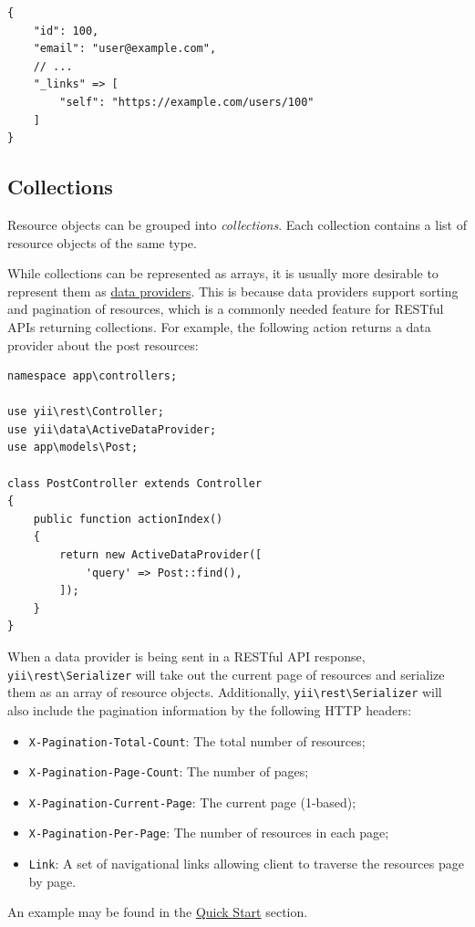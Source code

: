 \begin{lstlisting}
{
    "id": 100,
    "email": "user@example.com",
    // ...
    "_links" => [
        "self": "https://example.com/users/100"
    ]
}
\end{lstlisting}
\subsection{Collections \label{rest-resources.md::collections}}
Resource objects can be grouped into \textit{collections}. Each collection contains a list of resource objects
of the same type.

While collections can be represented as arrays, it is usually more desirable to represent them
as \hyperref[output-data-providers.md]{data providers}. This is because data providers support sorting and pagination
of resources, which is a commonly needed feature for RESTful APIs returning collections. For example,
the following action returns a data provider about the post resources:

\lstset{language=php}\begin{lstlisting}
namespace app\controllers;

use yii\rest\Controller;
use yii\data\ActiveDataProvider;
use app\models\Post;

class PostController extends Controller
{
    public function actionIndex()
    {
        return new ActiveDataProvider([
            'query' => Post::find(),
        ]);
    }
}
\end{lstlisting}
When a data provider is being sent in a RESTful API response, \texttt{yii{\allowbreak{}\textbackslash}rest{\allowbreak{}\textbackslash}Serializer} will take out the current
page of resources and serialize them as an array of resource objects. Additionally, \texttt{yii{\allowbreak{}\textbackslash}rest{\allowbreak{}\textbackslash}Serializer}
will also include the pagination information by the following HTTP headers:

\begin{itemize}
\item \lstinline|X-Pagination-Total-Count|: The total number of resources;
\item \lstinline|X-Pagination-Page-Count|: The number of pages;
\item \lstinline|X-Pagination-Current-Page|: The current page (1-based);
\item \lstinline|X-Pagination-Per-Page|: The number of resources in each page;
\item \lstinline|Link|: A set of navigational links allowing client to traverse the resources page by page.
\end{itemize}
An example may be found in the \hyperref[rest-quick-start.md::trying-it-out]{Quick Start} section.



